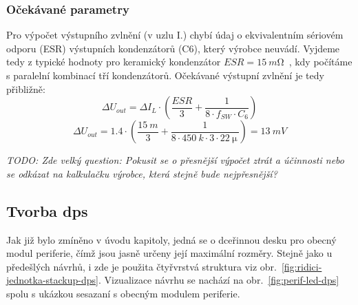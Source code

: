 \subsubsection{Očekávané parametry}
    Pro výpočet výstupního zvlnění (v uzlu I.) chybí údaj o ekvivalentním sériovém odporu (ESR) výstupních kondenzátorů (C6), který výrobce neuvádí. Vyjdeme tedy z typické hodnoty pro keramický kondenzátor \(ESR=\qty{15}{m\ohm}\)~\cite{wikipedia2024esr}, kdy počítáme s paralelní kombinací tří kondenzátorů.
    Očekávané výstupní zvlnění je tedy přibližně:
    \begin{equation}
        \Delta U_{out} = \Delta I_{L} \cdot  \left(\frac{ESR}{3}+\frac{1}{8\cdot f_{SW} \cdot C_{6} }\right) 
    \end{equation} 
    \begin{equation}
        \Delta U_{out} = \num{1.4} \cdot  \left(\frac{\qty{15}{m}}{3}+\frac{1}{8\cdot \qty{450}{k} \cdot 3\cdot \qty{22}{\micro\,} }\right)  = \qty{13}{mV}
    \end{equation} 

    \textit{TODO: Zde velký question: Pokusit se o přesnější výpočet ztrát a účinnosti nebo se odkázat na kalkulačku výrobce, která stejně bude nejpřesnější?}

\subsection{Tvorba \acs{dps}}
    Jak již bylo zmíněno v úvodu kapitoly, jedná se o dceřinnou desku pro obecný modul periferie, čímž jsou jasně určeny její maximální rozměry. Stejně jako u předešlých návrhů, i zde je použita čtyřvrstvá struktura viz obr.~\ref{fig:ridici-jednotka-stackup-dps}. Vizualizace návrhu se nachází na obr.~\ref{fig:perif-led-dps} spolu s ukázkou sesazaní s obecným modulem periferie. 


